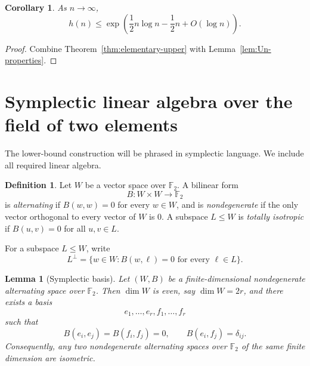 \documentclass[11pt]{article}
\newtheorem{lemma}[theorem]{Lemma}
\newtheorem{corollary}[theorem]{Corollary}
\theoremstyle{definition}
\newtheorem{definition}[theorem]{Definition}
\newcommand{\F}{\mathbb{F}}
\begin{document}
\begin{corollary}\label{cor:elementary-upper-asymptotic}
As $n\to\infty$,
\[
 h(n)\le
 \exp\!\left(\frac12n\log n-\frac12n+O(\log n)\right).
\]
\end{corollary}

\begin{proof}
Combine Theorem~\ref{thm:elementary-upper} with Lemma~\ref{lem:Un-properties}.
\end{proof}

\section{Symplectic linear algebra over the field of two elements}

The lower-bound construction will be phrased in symplectic language.  We include all required linear algebra.

\begin{definition}
Let $W$ be a vector space over $\F_2$.  A bilinear form
\[
 B:W\times W\longrightarrow\F_2
\]
is \emph{alternating} if $B(w,w)=0$ for every $w\in W$, and is \emph{nondegenerate} if the only vector orthogonal to every vector of $W$ is $0$.
A subspace $L\le W$ is \emph{totally isotropic} if $B(u,v)=0$ for all $u,v\in L$.
\end{definition}

For a subspace $L\le W$, write
\[
 L^\perp=\{w\in W:B(w,\ell)=0\text{ for every }\ell\in L\}.
\]

\begin{lemma}[Symplectic basis]\label{lem:symplectic-basis}
Let $(W,B)$ be a finite-dimensional nondegenerate alternating space over $\F_2$.  Then $\dim W$ is even, say $\dim W=2r$, and there exists a basis
\[
 e_1,\dots,e_r,f_1,\dots,f_r
\]
such that
\[
 B(e_i,e_j)=B(f_i,f_j)=0,
 \qquad
 B(e_i,f_j)=\delta_{ij}.
\]
Consequently, any two nondegenerate alternating spaces over $\F_2$ of the same finite dimension are isometric.
\end{lemma}
\end{document}
